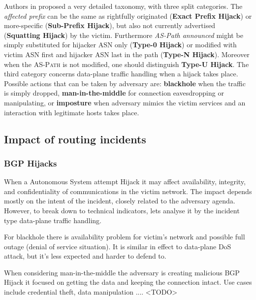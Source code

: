 Authors in \cite{Sermpezis2018a} proposed a very detailed taxonomy, with three split categories.  The \emph{affected prefix} can be the same as rightfully originated (\textbf{Exact Prefix Hijack}) or more-specific (\textbf{Sub-Prefix Hijack}), but also not currently advertised (\textbf{Squatting Hijack}) by the victim. Furthermore \emph{AS-Path announced} might be simply substituted for hijacker ASN only (\textbf{Type-0 Hijack}) or modified with victim ASN first and hijacker ASN last in the path (\textbf{Type-N Hijack}). Moreover when the \textsc{AS-Path} is not modified, one should distinguish \textbf{Type-U Hijack}. The third category concerns data-plane traffic handling when a hijack takes place. Possible actions that can be taken by adversary are: \textbf{blackhole} when the traffic is simply dropped, \textbf{man-in-the-middle} for connection eavesdropping or manipulating, or \textbf{imposture} when adversary mimics the victim services and an interaction with legitimate hosts takes place.



\subsection{Impact of routing incidents}
\label{def:impact}
\subsubsection{BGP Hijacks}
When a Autonomous System attempt Hijack it may affect availability, integrity, and confidentiality of communications in the victim network. The impact depends mostly on the intent of the incident, closely related to the adversary agenda. However, to break down to technical indicators, lets analyse it by the incident type data-plane traffic handling. 

For blackhole there is availability problem for victim's network and possible full outage (denial of service situation). It is similar in effect to data-plane DoS attack, but it's less expected and harder to defend to. 

When considering man-in-the-middle the adversary is creating malicious BGP Hijack it focused on getting the data and keeping the connection intact. Use cases include credential theft, data manipulation .... <TODO>

